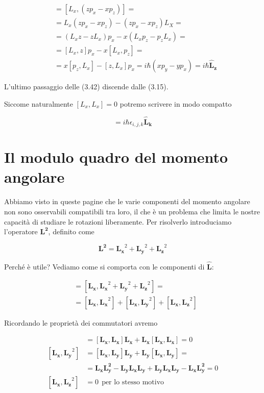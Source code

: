 \begin{align}
[\mathbf{\hat L_x}, \mathbf{\hat L_y} ]{}&= [ L_x , (zp_x - xp_z) ] = \nonumber \\
&= L_x(zp_x - xp_z) - (zp_x - xp_z)L_X= \nonumber \\
&= (L_x z - zL_x)p_x - x(L_x p_z - p_z L_x)= \nonumber \\
&= [L_x, z]p_x - x[L_x, p_z]= \nonumber \\
&= x[p_z, L_x] - [z, L_x]p_x = i\hbar (x p_y - y p_x)= i \hbar \mathbf{\hat L_z}
\end{align}

L'ultimo passaggio delle (3.42) discende dalle (3.15).

Siccome naturalmente $[L_x, L_x]=0$ potremo scrivere in modo compatto

\begin{equation}
[\mathbf{\hat L_i}, \mathbf{\hat L_j}]= i \hbar \epsilon_{i,j,k} \mathbf{\hat L_k}
\end{equation}

\section{Il modulo quadro del momento angolare}

Abbiamo visto in queste pagine che le varie componenti del momento angolare non sono osservabili compatibili tra loro, il che è un problema che limita le nostre capacità di studiare le rotazioni liberamente. Per risolverlo introduciamo l'operatore $\mathbf{L^2}$, definito come

\begin{equation}
\mathbf{L^2} = \mathbf{L_x}^2 + \mathbf{L_y}^2 + \mathbf{L_z}^2
\end{equation}

Perché è utile? Vediamo come si comporta con le componenti di $\mathbf{\hat L}$:

\begin{align}
[\mathbf{L_x}, \mathbf{L^2}] {}&= [\mathbf{L_x}, \mathbf{L_x}^2 + \mathbf{L_y}^2 + \mathbf{L_z}^2]= \nonumber \\
&= [\mathbf{L_x}, \mathbf{L_x}^2] + [\mathbf{L_x},\mathbf{L_y}^2] + [\mathbf{L_x},\mathbf{L_z}^2] 
\end{align}

Ricordando le proprietà dei commutatori avremo

\begin{align}
[\mathbf{L_x}, \mathbf{L_x}^2] {}&= [\mathbf{L_x}, \mathbf{L_x}]\mathbf{L_x} + \mathbf{L_x}[\mathbf{L_x}, \mathbf{L_x}] = 0 \\
[\mathbf{L_x}, \mathbf{L_y}^2] &= [\mathbf{L_x}, \mathbf{L_y}]\mathbf{L_y} + \mathbf{L_y}[\mathbf{L_x}, \mathbf{L_y}] = \nonumber \\
&= \mathbf{L_x}\mathbf{L_y^2} - \mathbf{L_y}\mathbf{L_x}\mathbf{L_y} + \mathbf{L_y}\mathbf{L_x}\mathbf{L_y} - \mathbf{L_x}\mathbf{L_y^2} = 0 \\
[\mathbf{L_x}, \mathbf{L_z}^2] &= 0 \:\: \text{per lo stesso motivo}
\end{align}

